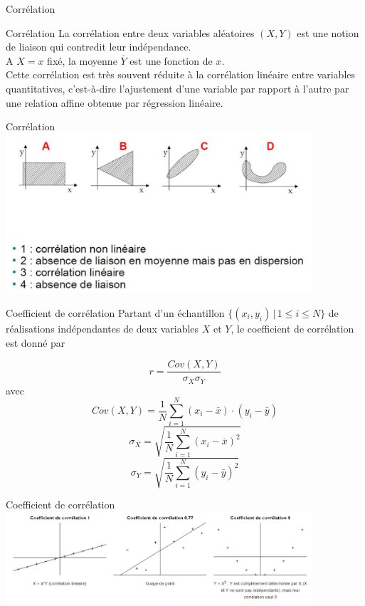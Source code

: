 \documentclass[10pt, french]{beamer}
\begin{document}
\begin{frame}{Corrélation}
\begin{block}{Corrélation}
La corrélation entre deux variables aléatoires $(X,Y)$ est une notion de liaison qui contredit leur indépendance.\\
A $X=x$ fixé, la moyenne $\bar Y$ est une fonction de $x$.\\
Cette corrélation est très souvent réduite à la corrélation linéaire entre variables quantitatives, c'est-à-dire l'ajustement d'une variable par rapport à l'autre par une relation affine obtenue par régression linéaire.
\end{block}
\end{frame}
\begin{frame}{Corrélation}
\includegraphics[width=4.5in]{Images/corr.png}
\end{frame}
\begin{frame}{Coefficient de corrélation}
Partant d'un échantillon $ \{(x_{i},y_{i})\,|\,1\leq i\leq N\}$ de réalisations indépendantes de deux variables $X$ et $Y$, le coefficient de corrélation est donné par

$$r=\dfrac {Cov(X,Y)}{{\sigma }_{X}{\sigma }_{Y}}$$
avec
$$Cov(X,Y)={\frac {1}{N}}\sum _{i=1}^{N}(x_{i}-{\bar {x}})\cdot (y_{i}-{\bar {y}})$$
$$\sigma_{X}=\sqrt {{\dfrac {1}{N}}\displaystyle \sum _{i=1}^{N}(x_{i}-{\bar {x}})^{2}}$$
$$\sigma_{Y}=\sqrt {{\dfrac {1}{N}}\displaystyle \sum _{i=1}^{N}(y_{i}-{\bar {y}})^{2}}$$
\end{frame}
\begin{frame}{Coefficient de corrélation}
\hspace{-0.8cm}\includegraphics[width=4.5in]{Images/corr_fig.png}
\end{frame}
\end{document}
